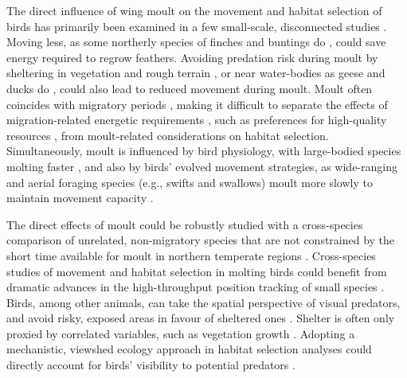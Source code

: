 The direct influence of wing moult on the movement and habitat selection of birds has primarily been examined in a few small-scale, disconnected studies \citep{bell1970,haukioja1971,green1975,francis1991,madsen1987,fox1998}.
Moving less, as some northerly species of finches and buntings do \citep{bell1970,haukioja1971,green1975,francis1991}, could save energy required to regrow feathers.
Avoiding predation risk during moult by sheltering in vegetation and rough terrain \citep{bell1970,haukioja1971,green1975,francis1991}, or near water-bodies as geese and ducks do \parencite{madsen1987,fox1998}, could also lead to reduced movement during moult.
Moult often coincides with migratory periods \citep{kiat2019}, making it difficult to separate the effects of migration-related energetic requirements \parencite{alerstam1990,wikelski2003,horvitz2014}, such as preferences for high-quality resources \parencite{madsen1987,fox1998}, from moult-related considerations on habitat selection.
Simultaneously, moult is influenced by bird physiology, with large-bodied species molting faster \citep{kiat2021,jenni2020}, and also by birds' evolved movement strategies, as wide-ranging and aerial foraging species (e.g., swifts and swallows) moult more slowly to maintain movement capacity \parencite{kiat2016}.

The direct effects of moult could be robustly studied with a cross-species comparison of unrelated, non-migratory species that are not constrained by the short time available for moult in northern temperate regions \parencite{ginn1983,jenni2020}.
Cross-species studies of movement and habitat selection in molting birds could benefit from dramatic advances in the high-throughput position tracking of small species \parencite{toledo2020,nathan2022}.
Birds, among other animals, can take the spatial perspective of visual predators, and avoid risky, exposed areas in favour of sheltered ones \parencite{hampton1994,emery2000,krams2001,davidson2016,krams2020}.
Shelter is often only proxied by correlated variables, such as vegetation growth \parencite{pettorelli2011}. 
Adopting a mechanistic, viewshed ecology approach \parencite{olsoy2015,aben2018,aben2021} in habitat selection analyses could directly account for birds' visibility to potential predators \parencite{olsoy2015,aben2018,aben2021}.


